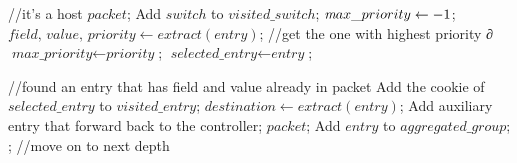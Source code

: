 \begin {tcolorbox}[blanker,float=tbp,
grow to left by=1cm, grow to right by=1cm]
\begin{algorithm}[H]
  \begin{algorithmic}[1]
       //it's a host
        \State \Return $packet$;
      \EndIf
      \State Add $switch$ to $visited\_switch$;
      \State $\textit max\_priority \gets -1$;  
        \State $\textit{field, value, priority} \gets extract(\textit{entry})$;
         //get the one with highest priority \sout{}∂
          \State $\textit{max\_priority} \gets \textit{priority}$;
          \State $\textit{selected\_entry} \gets \textit{entry}$; 
        \EndIf
      \EndFor

       \sout{}  //found an entry that has field and value already in packet
        \State Add the cookie of $selected\_entry$ to $visited\_entry$;
        \State $\textit{destination} \gets extract(\textit{entry})$;
          \State Add auxiliary entry that forward back to the controller;
          \State \Return $packet$;
        \Else
          \State Add $entry$ to $aggregated\_group$;
          \State {}; //move on to next depth
        \EndIf
      \EndIf
  \end{algorithmic}
\end{algorithm}
\end{tcolorbox}

